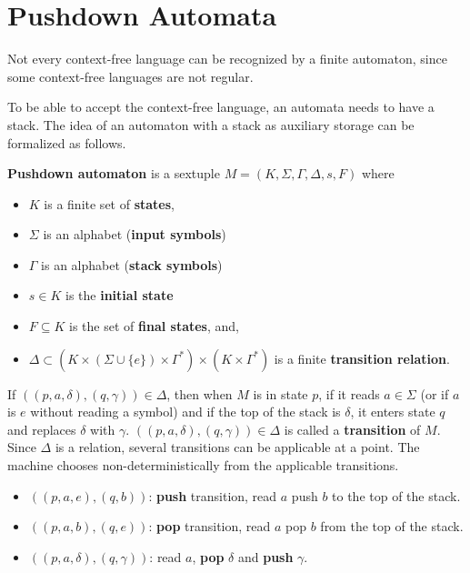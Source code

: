 \section{Pushdown Automata}

Not every context-free language can be recognized by a finite automaton, since some context-free languages are not regular.

To be able to accept the context-free language, an automata needs to have a stack. The idea of an automaton with a stack as auxiliary storage can be formalized as follows. 

\begin{definition}{}
  \textbf{Pushdown automaton} is a sextuple $M = (K, \Sigma, \Gamma, \Delta, s, F)$ where
  \begin{itemize}
    \item $K$ is a finite set of \textbf{states},
    \item $\Sigma$ is an alphabet (\textbf{input symbols})
    \item $\Gamma$ is an alphabet (\textbf{stack symbols})
    \item $s \in K$ is the \textbf{initial state}
    \item $F \subseteq K$ is the set of \textbf{final states}, and,
    \item $\Delta \subset (K \times (\Sigma \cup \{e\}) \times \Gamma^*) \times (K \times \Gamma^*)$ is a finite \textbf{transition relation}.
  \end{itemize}
\end{definition}

If $((p, a, \delta),(q, \gamma)) \in \Delta$, then when $M$ is in state $p$, if it reads $a \in \Sigma$ (or if $a$ is $e$ without reading a symbol) and if the top of the stack is $\delta$, it enters state $q$ and replaces $\delta$ with $\gamma$. $((p, a, \delta),(q, \gamma)) \in \Delta$ is called a \textbf{transition} of $M$. Since $\Delta$ is a relation, several transitions can be applicable at a point. The machine chooses non-deterministically from the applicable transitions.
\begin{itemize}
  \item $((p, a, e),(q, b))$: \textbf{push} transition, read $a$ push $b$ to the top of the stack.
  \item $((p, a, b),(q, e))$: \textbf{pop} transition, read $a$ pop $b$ from the top of the stack.
  \item $((p, a, \delta),(q, \gamma))$: read $a$, \textbf{pop} $\delta$ and \textbf{push} $\gamma$.
\end{itemize}

